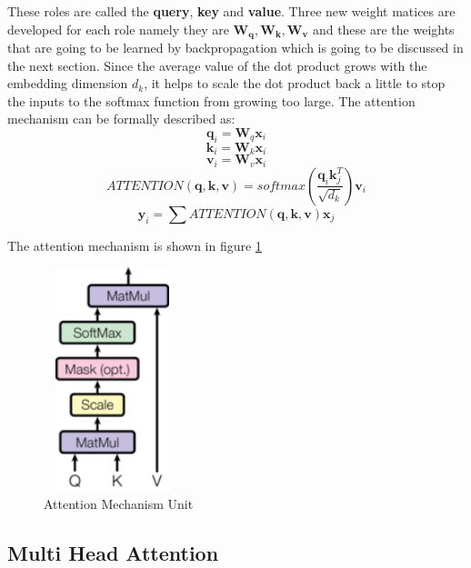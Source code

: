 These roles are called the \textbf{query}, \textbf{key} and \textbf{value}. Three new weight matices are developed for each role namely they are $\mathbf{W_q}, \mathbf{W_k}, \mathbf{W_v}$ and these are the weights that are going to be learned by backpropagation which is going to be discussed in the next section. Since the average value of the dot product grows with the embedding dimension $d_k$, it helps to scale the dot product back a little to stop the inputs to the softmax function from growing too large.
  The attention mechanism can be formally described as:
\begin{equation}
\mathbf{q}_i = \mathbf{W}_q \mathbf{x}_i
\end{equation}
\begin{equation}
    \mathbf{k}_i = \mathbf{W}_k \mathbf{x}_i
\end{equation}
\begin{equation}
    \mathbf{v}_i = \mathbf{W}_v \mathbf{x}_i 
\end{equation}
\begin{equation}
    ATTENTION(\mathbf{q,k,v}) = softmax(\frac{\mathbf{q}_i \mathbf{k}_j^T}{\sqrt{d_k}})\mathbf{v}_i
\end{equation}
\begin{equation}
    \mathbf{y}_i = \sum ATTENTION(\mathbf{q,k,v})\mathbf{x}_j    
\end{equation}

The attention mechanism is shown in figure \ref{fig:attention-unit}

\begin{figure}[ht]
\includegraphics[width=4.0cm, height=6.5cm]{images/attention unit.png}
\centering
\caption{Attention Mechanism Unit}
\label{fig:attention-unit}
\end{figure}
\FloatBarrier


\subsection{Multi Head Attention}

